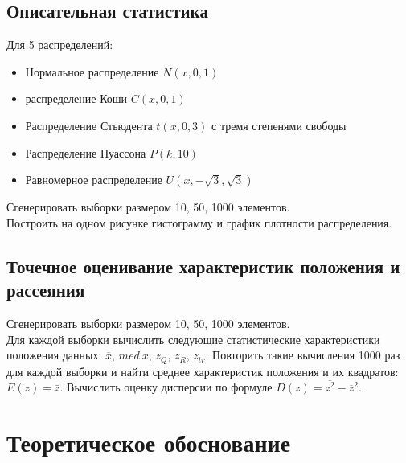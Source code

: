 \documentclass[12pt,a4paper]{article}
\begin{document}
	\subsection{Описательная статистика}
	Для 5 распределений:\\
	\begin{itemize}
	\item Нормальное распределение $N(x, 0, 1)$
	\item распределение Коши $C(x, 0, 1)$
	\item Распределение Стьюдента $t(x, 0, 3)$ с тремя степенями свободы
	\item Распределение Пуассона $P(k, 10)$
	\item Равномерное распределение $U(x, -\sqrt3, \sqrt3)$
	\end{itemize}
	Сгенерировать выборки размером 10, 50, 1000 элементов.\\
	Построить на одном рисунке гистограмму и график плотности распределения.

	\subsection{Точечное оценивание характеристик положения и рассеяния}
	Сгенерировать выборки размером 10, 50, 1000 элементов.\\
	Для каждой выборки вычислить следующие статистические характеристики положения данных: $\overline{x}$, $med\:x$, $z_{Q}$, $z_{R}$, $z_{tr}$. Повторить такие вычисления 1000 раз для каждой выборки и найти среднее характеристик положения и их квадратов: $E(z) = \bar{z}$. Вычислить оценку дисперсии по формуле $D(z) = \overline{z^2} - \overline{z}^2$.

	\section{Теоретическое обоснование}
\end{document}
